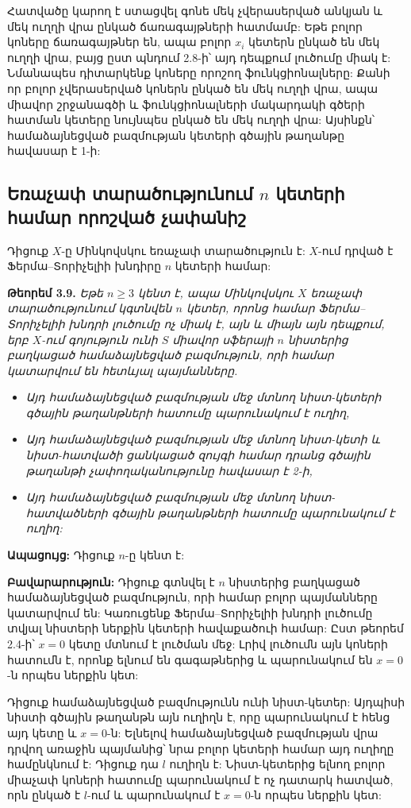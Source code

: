 \documentclass[12pt,a4paper]{article}
\numberwithin{equation}{section}
\numberwithin{figure}{section}
\begin{document}
Հատվածը կարող է ստացվել գոնե մեկ չվերասերված անկյան և մեկ ուղղի վրա ընկած ճառագայթների հատմամբ: Եթե բոլոր կոները ճառագայթներ են, ապա բոլոր $x_i$ կետերն ընկած են մեկ ուղղի վրա, բայց ըստ պնդում 2.8-ի՝ այդ դեպքում լուծումը միակ է: Նմանապես դիտարկենք կոները որոշող ֆունկցիոնալները: Քանի որ բոլոր չվերասերված կոներն ընկած են մեկ ուղղի վրա, ապա միավոր շրջանագծի և ֆունկցիոնալների մակարդակի գծերի հատման կետերը նույնպես ընկած են մեկ ուղղի վրա: Այսինքն՝ համաձայնեցված բազմության կետերի գծային թաղանթը հավասար է 1-ի: 

\subsection{Եռաչափ տարածությունում \texorpdfstring{$n$}{n} կետերի համար որոշված չափանիշ}

Դիցուք $X$-ը Մինկովսկու եռաչափ տարածություն է: $X$-ում դրված է Ֆերմա--Տորիչելիի խնդիրը $n$ կետերի համար:

\textbf{Թեորեմ 3.9.} \textit{Եթե $n \ge 3$ կենտ է, ապա Մինկովսկու $X$ եռաչափ տարածությունում կգտնվեն $n$ կետեր, որոնց համար Ֆերմա--Տորիչելիի խնդրի լուծումը ոչ միակ է, այն և միայն այն դեպքում, երբ $X$-ում գոյություն ունի $S$ միավոր սֆերայի $n$ նիստերից բաղկացած համաձայնեցված բազմություն, որի համար կատարվում են հետևյալ պայմանները.}

\begin{itemize}[label=\textbullet]
    \item \textit{Այդ համաձայնեցված բազմության մեջ մտնող նիստ-կետերի գծային թաղանթների հատումը պարունակում է ուղիղ,}
    \item \textit{Այդ համաձայնեցված բազմության մեջ մտնող նիստ-կետի և նիստ-հատվածի ցանկացած զույգի համար դրանց գծային թաղանթի չափողականությունը հավասար է 2-ի,}
    \item \textit{Այդ համաձայնեցված բազմության մեջ մտնող նիստ-հատվածների գծային թաղանթների հատումը պարունակում է ուղիղ:}
\end{itemize}

\textbf{Ապացույց:} Դիցուք $n$-ը կենտ է:

\textbf{Բավարարություն:} Դիցուք գտնվել է $n$ նիստերից բաղկացած համաձայնեցված բազմություն, որի համար բոլոր պայմանները կատարվում են: Կառուցենք Ֆերմա--Տորիչելիի խնդրի լուծումը տվյալ նիստերի ներքին կետերի հավաքածուի համար: Ըստ թեորեմ 2.4-ի՝ $x = 0$ կետը մտնում է լուծման մեջ: Լրիվ լուծումն այն կոների հատումն է, որոնք ելնում են գագաթներից և պարունակում են $x = 0$-ն որպես ներքին կետ:

Դիցուք համաձայնեցված բազմությունն ունի նիստ-կետեր: Այդպիսի նիստի գծային թաղանթն այն ուղիղն է, որը պարունակում է հենց այդ կետը և $x = 0$-ն: Ելնելով համաձայնեցված բազմության վրա դրվող առաջին պայմանից՝ նրա բոլոր կետերի համար այդ ուղիղը համընկնում է: Դիցուք դա $l$ ուղիղն է: Նիստ-կետերից ելնող բոլոր միաչափ կոների հատումը պարունակում է ոչ դատարկ հատված, որն ընկած է $l$-ում և պարունակում է $x = 0$-ն որպես ներքին կետ:
\end{document}
